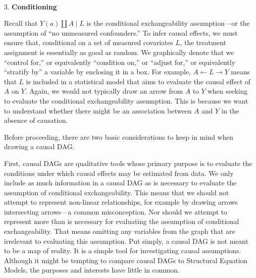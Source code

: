 \documentclass[
  singlecolumn]{article}
\makeatletter
\let\oldparagraph\paragraph
\renewcommand{\paragraph}{
    \@ifstar
      \xxxParagraphStar
      \xxxParagraphNoStar
  }
\newcommand{\xxxParagraphStar}[1]{\oldparagraph*{#1}\mbox{}}
\newcommand{\xxxParagraphNoStar}[1]{\oldparagraph{#1}\mbox{}}
\makeatother
\begin{document}
\paragraph{\texorpdfstring{3.
\textbf{Conditioning}}{3. Conditioning}}\label{conditioning}

Recall that \(Y(a) \coprod A \mid L\) is the conditional exchangeability
assumption---or the assumption of ``no unmeasured confounders.'' To
infer causal effects, we must ensure that, conditional on a set of
measured covariates \(L\), the treatment assignment is essentially as
good as random. We graphically denote that we ``control for,'' or
equivalently ``condition on,'' or ``adjust for,'' or equivalently
``stratify by'' a variable by enclosing it in a box. For example,
\(A \leftarrow \boxed{L} \rightarrow Y\) means that \(L\) is included in
a statistical model that aims to evaluate the causal effect of \(A\) on
\(Y\). Again, we would not typically draw an arrow from \(A\) to \(Y\)
when seeking to evaluate the conditional exchangeability assumption.
This is because we want to understand whether there might be an
association between \(A\) and \(Y\) in the absence of causation.

Before proceeding, there are two basic considerations to keep in mind
when drawing a causal DAG.

First, causal DAGs are qualitative tools whose primary purpose is to
evaluate the conditions under which causal effects may be estimated from
data. We only include as much information in a causal DAG as is
necessary to evaluate the assumption of conditional exchangeability.
This means that we should not attempt to represent non-linear
relationships, for example by drawing arrows intersecting arrows---a
common misconception. Nor should we attempt to represent more than is
necessary for evaluating the assumption of conditional exchangeability.
That means omitting any variables from the graph that are irrelevant to
evaluating this assumption. Put simply, a causal DAG is not meant to be
a map of reality. It is a simple tool for investigating causal
assumptions. Although it might be tempting to compare causal DAGs to
Structural Equation Models, the purposes and interests have little in
common.
\end{document}
